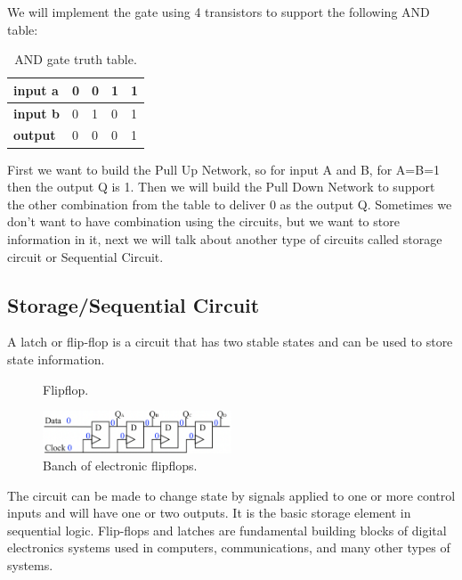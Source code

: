 We will implement the gate using 4 transistors to support the following AND
table:

\begin{table}[!ht]
    \centering
    \caption{AND gate truth table.}
    \begin{tabular}{lllll}
        \toprule
        \textbf{input a} & 0 & 0 & 1 & 1 \\ \midrule \textbf{input b} & 0 & 1 &
        0 & 1 \\ \midrule \textbf{output}  & 0 & 0 & 0 & 1 \\ \bottomrule
    \end{tabular}
\end{table}

First we want to build the Pull Up Network, so for input A and B, for A=B=1 then
the output Q is 1. Then we will build the Pull Down Network to support the other
combination from the table to deliver 0 as the output Q. Sometimes we don't want
to have combination using the circuits, but we want to store information in it,
next we will talk about another type of circuits called storage circuit or
Sequential Circuit.

\subsection{ Storage/Sequential Circuit }

A latch or flip-flop is a circuit that has two stable states and can be used to
store state information. 
\begin{figure}[!ht]
    \centering
    
    \caption{Flipflop.} \label{fig:flipflop}
\end{figure}

\begin{figure}[!ht]
	\centering
	\includegraphics[width=0.5\textwidth]{images/banch_of_flipflops.png}
	\caption{Banch of electronic flipflops.} \label{fig:banch_of_flipflops}
\end{figure}

The circuit can be made to change state by signals applied to one or more
control inputs and will have one or two outputs. It is the basic storage element
in sequential logic. Flip-flops and latches are fundamental building blocks of
digital electronics systems used in computers, communications, and many other
types of systems.

